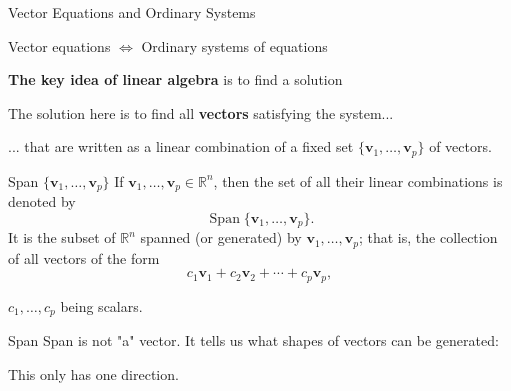 \begin{frame}{Vector Equations and Ordinary Systems}
  \begin{center}
    \Large Vector equations $\Longleftrightarrow$ Ordinary systems of equations
  \end{center}

  \medskip

  \textbf{The key idea of linear algebra} is to find a solution\pause

  The solution here is to find all \textbf{vectors} satisfying the system...\pause

  ... that are written as a linear combination of a fixed set
  $\{\mathbf{v}_1,\ldots,\mathbf{v}_p\}$ of vectors.
\end{frame}

\begin{frame}{Span $\{\mathbf{v}_1,\ldots,\mathbf{v}_p\}$}
  If $\mathbf{v}_1,\ldots,\mathbf{v}_p\in\mathbb{R}^n$, then the set of all
  their linear combinations is denoted by
  \[
    \operatorname{Span}\{\mathbf{v}_1,\ldots,\mathbf{v}_p\}.
  \]
  It is the subset of $\mathbb{R}^n$ \alert{spanned} (or \alert{generated})
  by $\mathbf{v}_1,\ldots,\mathbf{v}_p$; that is, the collection of all
  vectors of the form
  \[
    c_1\mathbf{v}_1+c_2\mathbf{v}_2+\cdots+c_p\mathbf{v}_p,
  \]

 \qquad $c_1,\ldots,c_p$ being scalars.
\end{frame}

\begin{frame}{Span}
    Span is not "a" vector. It tells us what shapes of vectors can be generated:
    \begin{figure}
            \centering
    \end{figure}
        
    This only has one direction.
\end{frame}


